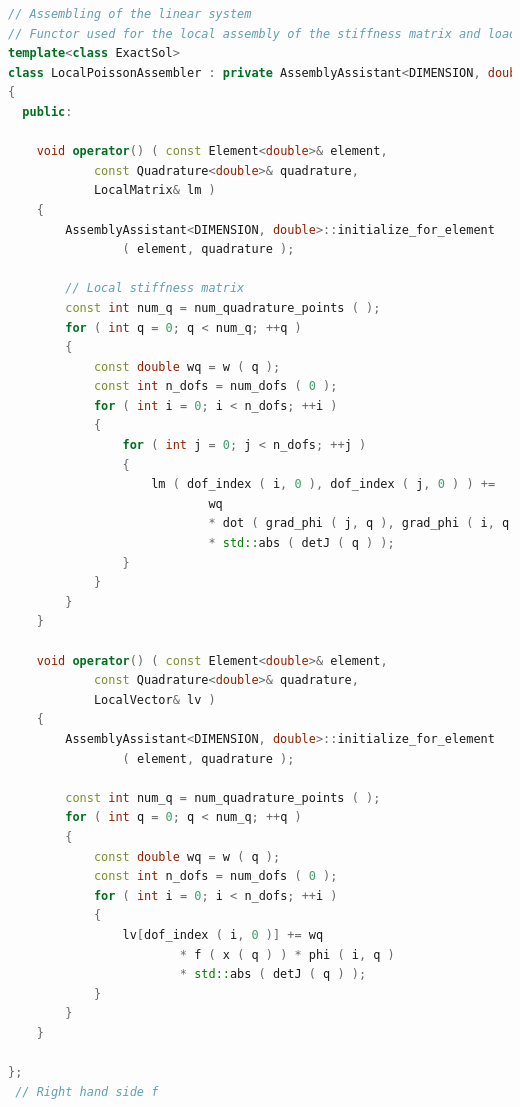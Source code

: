 \documentclass[a4paper, 11pt, twoside]{article}
\begin{document}
\begin{lstlisting}[language=C++, basicstyle={\footnotesize, \ttfamily}, keywordstyle=\color{blue}, numbers=none, tabsize=4]
// Assembling of the linear system
// Functor used for the local assembly of the stiffness matrix and load vector.
template<class ExactSol>
class LocalPoissonAssembler : private AssemblyAssistant<DIMENSION, double>
{
  public:

    void operator() ( const Element<double>& element,
            const Quadrature<double>& quadrature,
            LocalMatrix& lm )
    {
        AssemblyAssistant<DIMENSION, double>::initialize_for_element
                ( element, quadrature );

        // Local stiffness matrix
        const int num_q = num_quadrature_points ( );
        for ( int q = 0; q < num_q; ++q )
        {
            const double wq = w ( q );
            const int n_dofs = num_dofs ( 0 );
            for ( int i = 0; i < n_dofs; ++i )
            {
                for ( int j = 0; j < n_dofs; ++j )
                {
                    lm ( dof_index ( i, 0 ), dof_index ( j, 0 ) ) +=
                            wq
                            * dot ( grad_phi ( j, q ), grad_phi ( i, q ) )
                            * std::abs ( detJ ( q ) );
                }
            }
        }
    }

    void operator() ( const Element<double>& element,
            const Quadrature<double>& quadrature,
            LocalVector& lv )
    {
        AssemblyAssistant<DIMENSION, double>::initialize_for_element
                ( element, quadrature );

        const int num_q = num_quadrature_points ( );
        for ( int q = 0; q < num_q; ++q )
        {
            const double wq = w ( q );
            const int n_dofs = num_dofs ( 0 );
            for ( int i = 0; i < n_dofs; ++i )
            {
                lv[dof_index ( i, 0 )] += wq
                        * f ( x ( q ) ) * phi ( i, q )
                        * std::abs ( detJ ( q ) );
            }
        }
    }

};
 // Right hand side f


\end{lstlisting}
\end{document}
